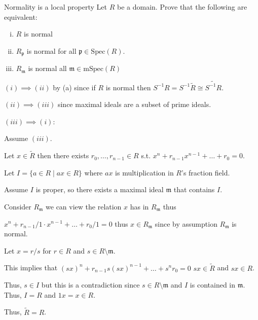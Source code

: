 \documentclass[12pt, letterpaper]{article}
\newcommand{\p}{\mathfrak{p}}
\newcommand{\Spec}{\mathrm{Spec}}
\newcommand{\mf}[1]{\mathfrak{#1}}
\begin{document}
\begin{subproblem}{Normality is a local property}
    Let $R$ be a domain. Prove that the following are
equivalent:
\begin{enumerate}[i.]
    \item $R$ is normal
    \item $R_\p$ is normal for all $\p \in \Spec(R)$.
    \item $R_\mf{m}$ is normal all $\mf{m} \in \mathrm{mSpec}(R)$
\end{enumerate}
\end{subproblem}
\begin{problemproof}
    $(i) \implies (ii)$ by (a) since if $R$ is normal then $S^{-1}R = S^{-1}\widetilde{R} \cong \widetilde{S^{-1}R}$.

    $(ii) \implies (iii)$ since maximal ideals are a subset of prime ideals.

    $(iii) \implies (i)$:

    Assume $(iii)$.

    Let $x \in \widetilde{R}$ then there exists $r_0,\dots,r_{n-1} \in R$ s.t. $x^n+r_{n-1}x^{n-1}+\dots+r_0=0$.

    Let $I=\{a \in R \mid ax \in R\}$ where $ax$ is multiplication in $R$'s fraction field.

    Assume $I$ is proper, so there exists a maximal ideal $\mf{m}$ that contains $I$.

    Consider $R_{\mf{m}}$ we can view the relation $x$ has in $R_\mf{m}$ thus

    $x^n+r_{n-1}/1 \cdot x^{n-1}+\dots+r_0/1=0$ thus $x \in R_\mf{m}$ since by assumption $R_\mf{m}$ is normal.
    
    Let $x=r/s$ for $r \in R$ and $s \in R \setminus \mf{m}$.

    This implies that $(sx)^n+r_{n-1}s(sx)^{n-1}+\dots+s^nr_0=0$ $sx \in \widetilde{R}$ and $sx \in R$.

    Thus, $s \in I$ but this is a contradiction since $s \in R \setminus \mf{m}$ and $I$ is contained in $\mf{m}$. Thus, $I=R$ and $1x=x \in R$.
    
    Thus, $\widetilde{R}=R$.
\end{problemproof}
\end{document}
